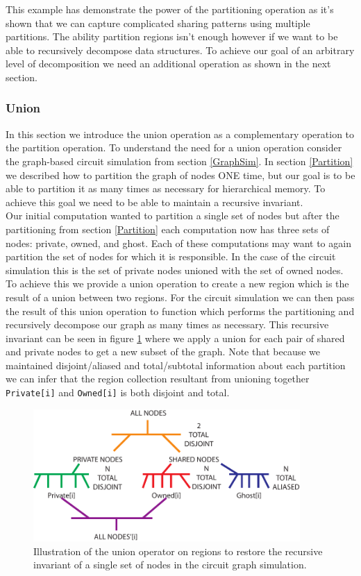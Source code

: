 \documentclass{article}
\theoremstyle{definition}
\begin{document}
\noindent
This example has demonstrate the power of the partitioning operation as it's shown
that we can capture complicated sharing patterns using multiple partitions.  The
ability partition regions isn't enough however if we want to be able to recursively
decompose data structures.  To achieve our goal of an arbitrary level of 
decomposition we need an additional operation as shown in the next section.

\subsubsection{Union \label{Union}}
\noindent
In this section we introduce the union operation as a complementary operation
to the partition operation.  To understand the need for a union operation consider
the graph-based circuit simulation from section \ref{GraphSim}.  In section \ref{Partition}
we described how to partition the graph of nodes ONE time, but our goal is to
be able to partition it as many times as necessary for hierarchical memory.  To
achieve this goal we need to be able to maintain a recursive invariant.\\

\noindent
Our initial computation wanted to partition a single set of nodes but after
the partitioning from section \ref{Partition} each computation now has three
sets of nodes: private, owned, and ghost.  Each of these computations may want
to again partition the set of nodes for which it is responsible.  In the
case of the circuit simulation this is the set of private nodes unioned with
the set of owned nodes.  To achieve this we provide a union operation to create
a new region which is the result of a union between two regions.  For the circuit
simulation we can then pass the result of this union operation to function
which performs the partitioning and recursively decompose our graph as many times
as necessary.  This recursive invariant can be seen in figure \ref{fig:UnionPartition}
where we apply a union for each pair of shared and private nodes to get a new
subset of the graph.  Note that because we maintained disjoint/aliased and
total/subtotal information about each partition we can infer that the region
collection resultant from unioning together {\tt Private[i]} and {\tt Owned[i]}
is both disjoint and total. \\

\begin{figure}[t]
\centering
\includegraphics[width=4in]{figs/UnionPartitionGraph.pdf}
\caption{Illustration of the union operator on regions to restore the recursive
invariant of a single set of nodes in the circuit graph simulation. \label{fig:UnionPartition}}
\end{figure}
\end{document}

